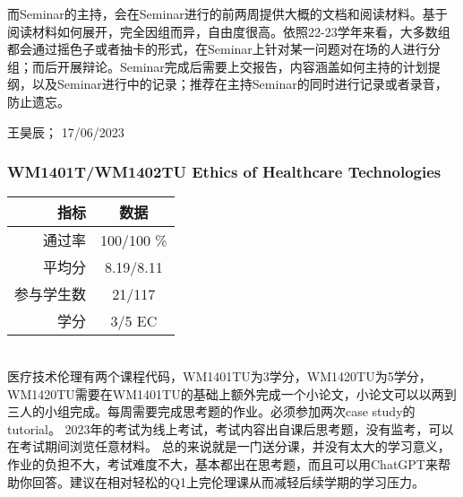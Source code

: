 而Seminar的主持，会在Seminar进行的前两周提供大概的文档和阅读材料。基于阅读材料如何展开，完全因组而异，自由度很高。依照22-23学年来看，大多数组都会通过摇色子或者抽卡的形式，在Seminar上针对某一问题对在场的人进行分组；而后开展辩论。Seminar完成后需要上交报告，内容涵盖如何主持的计划提纲，以及Seminar进行中的记录；推荐在主持Seminar的同时进行记录或者录音，防止遗忘。

\begin{flushright}
王昊辰； 17/06/2023
\end{flushright}

\subsubsection{WM1401T/WM1402TU Ethics of Healthcare Technologies}
\begin{minipage}{0.45\textwidth}
\centering
{}
\end{minipage}%
\begin{minipage}{0.45\textwidth}
\raggedleft
\begin{tabular}{r|c}
\textbf{指标} & \textbf{数据} \\ \hline
通过率 &100/100 \% \\ 
平均分 & 8.19/8.11 \\ 
参与学生数 &21/117 \\
学分 & 3/5 EC\\
\end{tabular}
\end{minipage}\\

医疗技术伦理有两个课程代码，WM1401TU为3学分，WM1420TU为5学分，WM1420TU需要在WM1401TU的基础上额外完成一个小论文，小论文可以以两到三人的小组完成。每周需要完成思考题的作业。必须参加两次case study的tutorial。
2023年的考试为线上考试，考试内容出自课后思考题，没有监考，可以在考试期间浏览任意材料。
总的来说就是一门送分课，并没有太大的学习意义，作业的负担不大，考试难度不大，基本都出在思考题，而且可以用ChatGPT来帮助你回答。建议在相对轻松的Q1上完伦理课从而减轻后续学期的学习压力。

